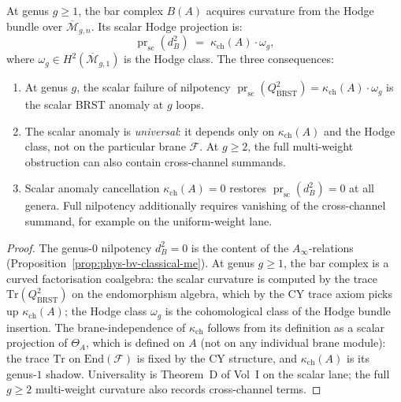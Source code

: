 \begin{theorem}[Curvature = BRST anomaly; Adler--Bardeen universality]
\label{thm:phys-bv-curvature-anomaly}
At genus $g \geq 1$, the bar complex $B(A)$ acquires curvature from the Hodge bundle over $\overline{\mathcal{M}}_{g,n}$. Its scalar Hodge projection is:
\begin{equation}
\label{eq:phys-bv-curvature}
 \operatorname{pr}_{\mathrm{sc}}(d_B^2) \;=\; \kappa_{\mathrm{ch}}(A) \cdot \omega_g,
\end{equation}
where $\omega_g \in H^2(\overline{\mathcal{M}}_{g,1})$ is the Hodge class. The three consequences:
\begin{enumerate}[label=\textup{(\roman*)}]
 \item At genus $g$, the scalar failure of nilpotency
 $\operatorname{pr}_{\mathrm{sc}}(Q_{\mathrm{BRST}}^2)
 = \kappa_{\mathrm{ch}}(A)\cdot\omega_g$ is the scalar BRST anomaly at
 $g$ loops.
 \item The scalar anomaly is \emph{universal}: it depends only on
 $\kappa_{\mathrm{ch}}(A)$ and the Hodge class, not on the particular
 brane $\mathcal{F}$. At $g\geq2$, the full multi-weight obstruction can
 also contain cross-channel summands.
 \item Scalar anomaly cancellation $\kappa_{\mathrm{ch}}(A) = 0$ restores
 $\operatorname{pr}_{\mathrm{sc}}(d_B^2)=0$ at all genera. Full
 nilpotency additionally requires vanishing of the cross-channel
 summand, for example on the uniform-weight lane.
\end{enumerate}
\end{theorem}

\begin{proof}
The genus-$0$ nilpotency $d_B^2 = 0$ is the content of the $A_\infty$-relations (Proposition~\ref{prop:phys-bv-classical-me}). At genus $g \geq 1$, the bar complex is a curved factorisation coalgebra: the scalar curvature is computed by the trace $\mathrm{Tr}(Q_{\mathrm{BRST}}^2)$ on the endomorphism algebra, which by the CY trace axiom picks up $\kappa_{\mathrm{ch}}(A)$; the Hodge class $\omega_g$ is the cohomological class of the Hodge bundle insertion. The brane-independence of $\kappa_{\mathrm{ch}}$ follows from its definition as a scalar projection of $\Theta_A$, which is defined on $A$ (not on any individual brane module): the trace $\mathrm{Tr}$ on $\mathrm{End}(\mathcal{F})$ is fixed by the CY structure, and $\kappa_{\mathrm{ch}}(A)$ is its genus-$1$ shadow. Universality is Theorem~D of Vol~I on the scalar lane; the full $g\geq2$ multi-weight curvature also records cross-channel terms.
\end{proof}

